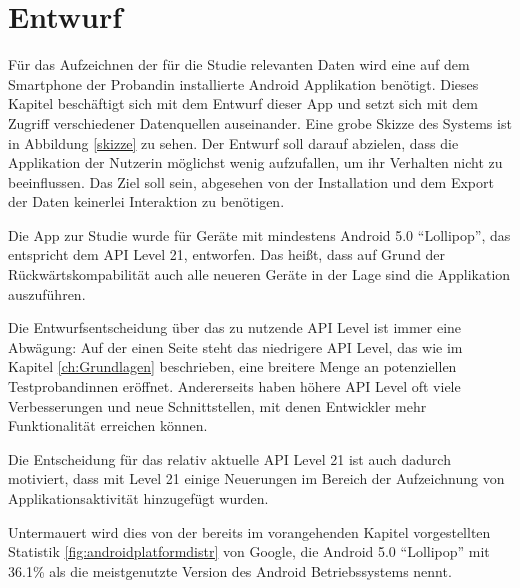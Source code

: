 
\chapter{Entwurf}
\label{ch:Entwurf}

Für das Aufzeichnen der für die Studie relevanten Daten wird eine auf dem Smartphone der Probandin installierte Android Applikation benötigt. 
Dieses Kapitel beschäftigt sich mit dem Entwurf dieser App und setzt sich mit dem Zugriff verschiedener Datenquellen auseinander.
Eine grobe Skizze des Systems ist in Abbildung \ref{skizze} zu sehen.
Der Entwurf soll darauf abzielen, dass die Applikation der Nutzerin möglichst wenig aufzufallen, um ihr Verhalten nicht zu beeinflussen.
Das Ziel soll sein, abgesehen von der Installation und dem Export der Daten keinerlei Interaktion zu benötigen. 
\par

Die App zur Studie wurde für Geräte mit mindestens Android 5.0 "`Lollipop"', das entspricht dem API Level 21, entworfen.
Das heißt, dass auf Grund der Rückwärtskompabilität auch alle neueren Geräte in der Lage sind die Applikation auszuführen.
\par


Die Entwurfsentscheidung über das zu nutzende API Level ist immer eine Abwägung:
Auf der einen Seite steht das niedrigere API Level, das wie im Kapitel \ref{ch:Grundlagen} beschrieben, 
eine breitere Menge an potenziellen Testprobandinnen eröffnet.
Andererseits haben höhere API Level oft viele Verbesserungen und neue Schnittstellen, mit denen Entwickler mehr Funktionalität erreichen können.
\par
Die Entscheidung für das relativ aktuelle API Level 21 ist auch dadurch motiviert, 
dass mit Level 21 einige Neuerungen im Bereich der Aufzeichnung von Applikationsaktivität hinzugefügt wurden.

Untermauert wird dies von der bereits im vorangehenden Kapitel vorgestellten Statistik \ref{fig:androidplatformdistr}  von Google\cite{androiddistr}, 
die Android 5.0 "`Lollipop"' mit 36.1\% als die meistgenutzte Version des Android Betriebssystems nennt.

